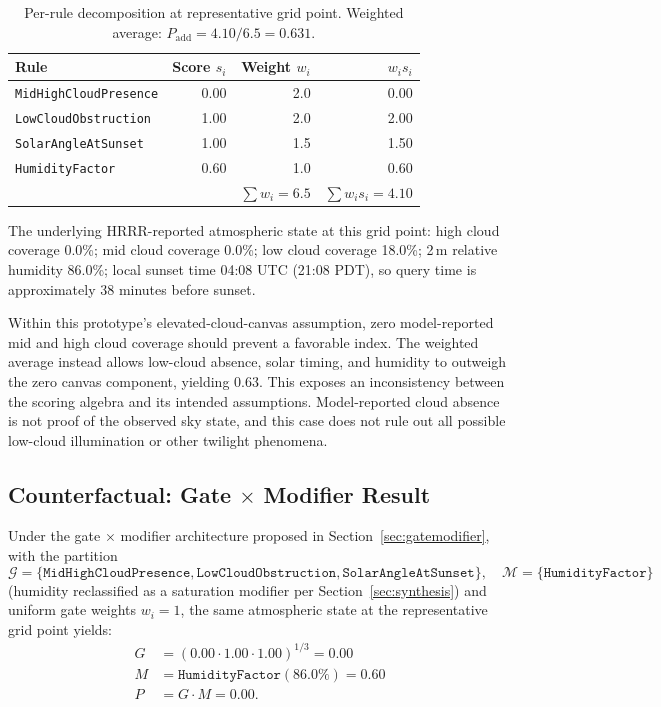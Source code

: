\documentclass[11pt,a4paper]{article}
\begin{document}
\begin{table}[H]
\centering
\small
\begin{tabular}{lrrr}
\toprule
Rule & Score $s_i$ & Weight $w_i$ & $w_i s_i$ \\
\midrule
\texttt{MidHighCloudPresence} & 0.00 & 2.0 & 0.00 \\
\texttt{LowCloudObstruction} & 1.00 & 2.0 & 2.00 \\
\texttt{SolarAngleAtSunset} & 1.00 & 1.5 & 1.50 \\
\texttt{HumidityFactor} & 0.60 & 1.0 & 0.60 \\
\midrule
& & $\sum w_i = 6.5$ & $\sum w_i s_i = 4.10$ \\
\bottomrule
\end{tabular}
\caption{Per-rule decomposition at representative grid point. Weighted average: $P_{\text{add}} = 4.10 / 6.5 = 0.631$.}
\label{tab:casestudy_decomp}
\end{table}

The underlying HRRR-reported atmospheric state at this grid point: high cloud coverage 0.0\%; mid cloud coverage 0.0\%; low cloud coverage 18.0\%; 2\,m relative humidity 86.0\%; local sunset time 04:08 UTC (21:08 PDT), so query time is approximately 38 minutes before sunset.

Within this prototype's elevated-cloud-canvas assumption, zero model-reported mid and high cloud coverage should prevent a favorable index. The weighted average instead allows low-cloud absence, solar timing, and humidity to outweigh the zero canvas component, yielding 0.63. This exposes an inconsistency between the scoring algebra and its intended assumptions. Model-reported cloud absence is not proof of the observed sky state, and this case does not rule out all possible low-cloud illumination or other twilight phenomena.

\subsection{Counterfactual: Gate $\times$ Modifier Result}

Under the gate $\times$ modifier architecture proposed in Section~\ref{sec:gatemodifier}, with the partition
\[
\mathcal{G} = \{\texttt{MidHighCloudPresence}, \texttt{LowCloudObstruction}, \texttt{SolarAngleAtSunset}\}, \quad \mathcal{M} = \{\texttt{HumidityFactor}\}
\]
(humidity reclassified as a saturation modifier per Section~\ref{sec:synthesis}) and uniform gate weights $w_i = 1$, the same atmospheric state at the representative grid point yields:
\begin{align*}
G &= (0.00 \cdot 1.00 \cdot 1.00)^{1/3} = 0.00 \\
M &= \texttt{HumidityFactor}(86.0\%) = 0.60 \\
P &= G \cdot M = 0.00.
\end{align*}
\end{document}
